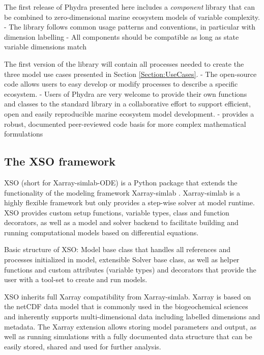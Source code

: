 \documentclass[journal abbreviation, manuscript]{copernicus}
\begin{document}
The first release of Phydra presented here includes a \textit{component} library that can be combined to zero-dimensional marine ecosystem models of variable complexity. 
- The library follows common usage patterns and conventions, in particular with dimension labelling
- All components should be compatible as long as state variable dimensions match

The first version of the library will contain all processes needed to create the three model use cases presented in Section \ref{Section:UseCases}. 
- The open-source code allows users to easy develop or modify processes to describe a specific ecosystem.
- Users of Phydra are very welcome to provide their own functions and classes to the standard library in a collaborative effort to support efficient, open and easily reproducible marine ecosystem model development.
- provides a robust, documented peer-reviewed code basis for more complex mathematical formulations


\subsection{The XSO framework} \label{Section:XSOFramework}

XSO (short for Xarray-simlab-ODE) is a Python package that extends the functionality of the modeling framework Xarray-simlab \citep{Bovy2018Xarray-simlab:Interactively}. Xarray-simlab is a highly flexible framework but only provides a step-wise solver at model runtime. XSO provides custom setup functions, variable types, class and function decorators, as well as a model and solver backend to facilitate building and running computational models based on differential equations. 

Basic structure of XSO: Model base class that handles all references and processes initialized in model, extensible Solver base class, as well as helper functions and custom attributes (variable types) and decorators that provide the user with a tool-set to create and run models.

XSO inherits full Xarray compatibility from Xarray-simlab. Xarray is based on the netCDF data model that is commonly used in the biogeochemical sciences and inherently supports multi-dimensional data including labelled dimensions and metadata. The Xarray extension allows storing model parameters and output, as well as running simulations with a fully documented data structure that can be easily stored, shared and used for further analysis.
\end{document}
